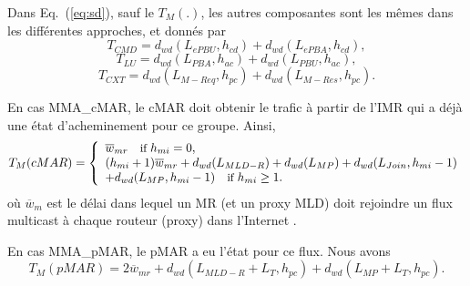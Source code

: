 Dans Eq.~(\ref{eq:sd}), sauf le $T_{M}{(.)}$, les autres composantes sont les mêmes dans les différentes approches, et donnés par \\ 
\begin{equation}
T_{CMD} = d_{wd}(L_{ePBU},h_{cd}) + d_{wd}(L_{ePBA},h_{cd}),
\end{equation}
\begin{equation}
T_{LU} = d_{wd}(L_{PBA}, h_{ac}) + d_{wd}(L_{PBU}, h_{ac}),
\end{equation}
\begin{equation}
T_{CXT} = d_{wd}(L_{M-Req},h_{pc}) +d_{wd}(L_{M-Res},h_{pc}).
\end{equation}

En cas MMA\_cMAR, le cMAR doit obtenir le trafic à partir de l'IMR qui a déjà une état ​​d'acheminement pour ce groupe. Ainsi, \\

\small
\[ T_{M}(cMAR) = \left\{ 
 \begin{array}{l l}
   \overline{w}_{mr} \quad \small \text{if } h_{mi} =0,  \\
   (h_{mi} +1) \overline{w}_{mr}+d_{wd}(L_{MLD-R}) + d_{wd}(L_{MP}) +  d_{wd}(L_{Join},h_{mi}-1) \\+d_{wd}(L_{MP},h_{mi}-1)   \quad \small \text{if }h_{mi} \geq 1. 
 \end{array} \right.\] 
\normalsize 
où $ \overline{w}_{m} $ est le délai dans lequel un MR (et un proxy MLD) doit rejoindre un flux multicast à chaque routeur (proxy) dans l'Internet \cite{MPDSR}.

En cas MMA\_pMAR, le pMAR a eu l'état pour ce flux. Nous avons \\
\begin{equation}
T_{M}(pMAR) = 2\overline{w}_{mr} +d_{wd}(L_{MLD-R}+L_{T},h_{pc})+d_{wd}(L_{MP} +L_{T},h_{pc}).
\end{equation}

